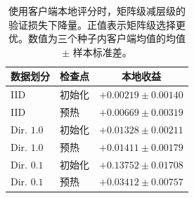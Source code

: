\begin{table}[t]
\centering
\caption{使用客户端本地评分时，矩阵级减层级的验证损失下降量。正值表示矩阵级选择更优。数值为三个种子内客户端均值的均值 $\pm$ 样本标准差。}
\label{tab:fm-p2-complete}
\small
\begin{tabular}{@{}llc@{}}
\toprule
数据划分 & 检查点 & 本地收益 \\
\midrule
IID & 初始化 & $+0.00219\pm0.00140$ \\
IID & 预热 & $+0.00669\pm0.00319$ \\
Dir. $1.0$ & 初始化 & $+0.01328\pm0.00211$ \\
Dir. $1.0$ & 预热 & $+0.01411\pm0.00179$ \\
Dir. $0.1$ & 初始化 & $+0.13752\pm0.01708$ \\
Dir. $0.1$ & 预热 & $+0.03412\pm0.00757$ \\
\bottomrule
\end{tabular}
\end{table}
